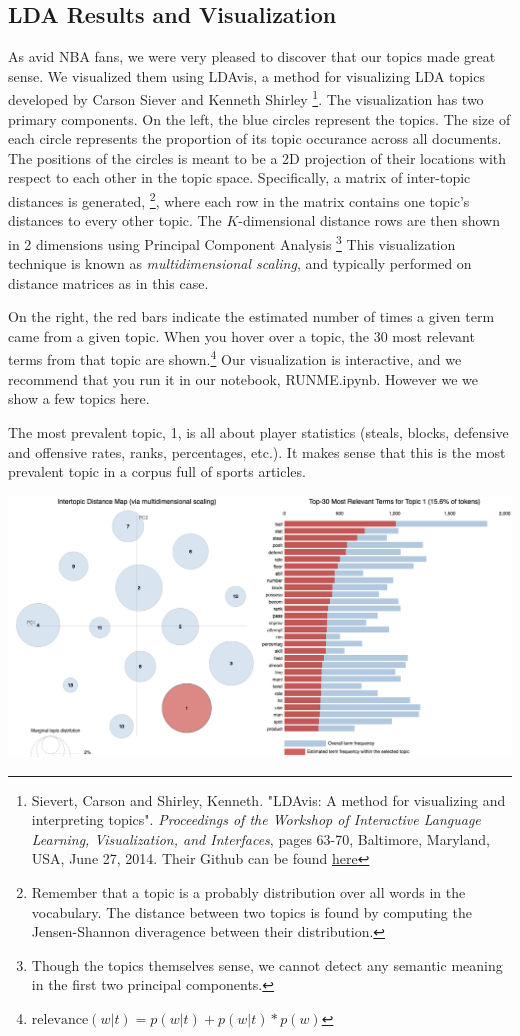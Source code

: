 \documentclass[11pt]{article}
\begin{document}
\subsection{LDA Results and Visualization}
As avid NBA fans, we were very pleased to discover that our topics made great sense.  We visualized them using LDAvis, a method for visualizing LDA topics developed by Carson Siever and Kenneth Shirley \footnote{Sievert, Carson and Shirley, Kenneth. "LDAvis: A method for visualizing and interpreting topics". \textit{Proceedings of the Workshop of Interactive Language Learning, Visualization, and Interfaces}, pages 63-70, Baltimore, Maryland, USA, June 27, 2014. Their Github can be found \href{https://github.com/cpsievert/LDAvis}{here}}.  The visualization has two primary components.  On the left, the blue circles represent the topics. The size of each circle represents the proportion of its topic occurance across all documents. The positions of the circles is meant to be a 2D projection of their locations with respect to each other in the topic space. Specifically, a matrix of inter-topic distances is generated, \footnote{Remember that a topic is a probably distribution over all words in the vocabulary. The distance between two topics is found by computing the Jensen-Shannon diveragence between their distribution.}, where each row in the matrix contains one topic's distances to every other topic.  The $K$-dimensional distance rows are then shown in 2 dimensions using Principal Component Analysis \footnote{Though the topics themselves sense, we cannot detect any semantic meaning in the first two principal components.} This visualization technique is known as \textit{multidimensional scaling}, and typically performed on distance matrices as in this case. 

On the right, the red bars indicate the estimated number of times a given term came from a given topic. When you hover over a topic, the 30 most relevant terms from that topic are shown.\footnote{$\text{relevance}(w | t) = p(w | t) + p(w | t)*p(w)$}  Our visualization is interactive, and we recommend that you run it in our notebook, RUNME.ipynb.  However we we show a few topics here. 

The most prevalent topic, 1, is all about player statistics (steals, blocks, defensive and offensive rates, ranks, percentages, etc.). It makes sense that this is the most prevalent topic in a corpus full of sports articles. 

\includegraphics[width=470pt]{1.png} 
\end{document}
